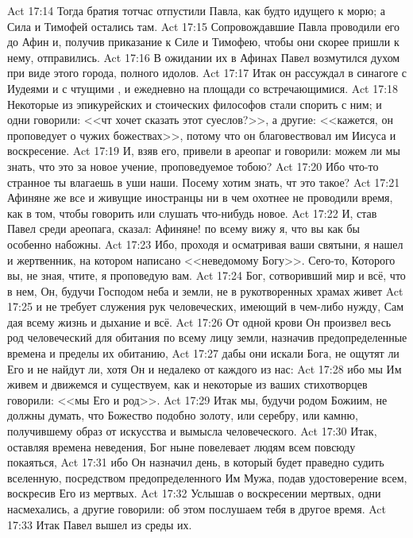 \vs Act 17:14 Тогда братия тотчас отпустили Павла, как будто идущего к морю; а Сила и Тимофей остались там.
\vs Act 17:15 Сопровождавшие Павла проводили его до Афин и, получив приказание к Силе и Тимофею, чтобы они скорее пришли к нему, отправились.
\rsbpar\vs Act 17:16 В ожидании их в Афинах Павел возмутился духом при виде этого города, полного идолов.
\vs Act 17:17 Итак он рассуждал в синагоге с Иудеями и с чтущими , и ежедневно на площади со встречающимися.
\vs Act 17:18 Некоторые из эпикурейских и стоических философов стали спорить с ним; и одни говорили: <<чт хочет сказать этот суеслов?>>, а другие: <<кажется, он проповедует о чужих божествах>>, потому что он благовествовал им Иисуса и воскресение.
\vs Act 17:19 И, взяв его, привели в ареопаг и говорили: можем ли мы знать, что это за новое учение, проповедуемое тобою?
\vs Act 17:20 Ибо что-то странное ты влагаешь в уши наши. Посему хотим знать, чт это такое?
\vs Act 17:21 Афиняне же все и живущие  иностранцы ни в чем охотнее не проводили время, как в том, чтобы говорить или слушать что-нибудь новое.
\rsbpar\vs Act 17:22 И, став Павел среди ареопага, сказал: Афиняне! по всему вижу я, что вы как бы особенно набожны.
\vs Act 17:23 Ибо, проходя и осматривая ваши святыни, я нашел и жертвенник, на котором написано <<неведомому Богу>>. Сего-то, Которого вы, не зная, чтите, я проповедую вам.
\vs Act 17:24 Бог, сотворивший мир и всё, что в нем, Он, будучи Господом неба и земли, не в рукотворенных храмах живет
\vs Act 17:25 и не требует служения рук человеческих,  имеющий в чем-либо нужду, Сам дая всему жизнь и дыхание и всё.
\vs Act 17:26 От одной крови Он произвел весь род человеческий для обитания по всему лицу земли, назначив предопределенные времена и пределы их обитанию,
\vs Act 17:27 дабы они искали Бога, не ощутят ли Его и не найдут ли, хотя Он и недалеко от каждого из нас:
\vs Act 17:28 ибо мы Им живем и движемся и существуем, как и некоторые из ваших стихотворцев говорили: <<мы Его и род>>.
\vs Act 17:29 Итак мы, будучи родом Божиим, не должны думать, что Божество подобно золоту, или серебру, или камню, получившему образ от искусства и вымысла человеческого.
\vs Act 17:30 Итак, оставляя времена неведения, Бог ныне повелевает людям всем повсюду покаяться,
\vs Act 17:31 ибо Он назначил день, в который будет праведно судить вселенную, посредством предопределенного Им Мужа, подав удостоверение всем, воскресив Его из мертвых.
\vs Act 17:32 Услышав о воскресении мертвых, одни насмехались, а другие говорили: об этом послушаем тебя в другое время.
\vs Act 17:33 Итак Павел вышел из среды их.
